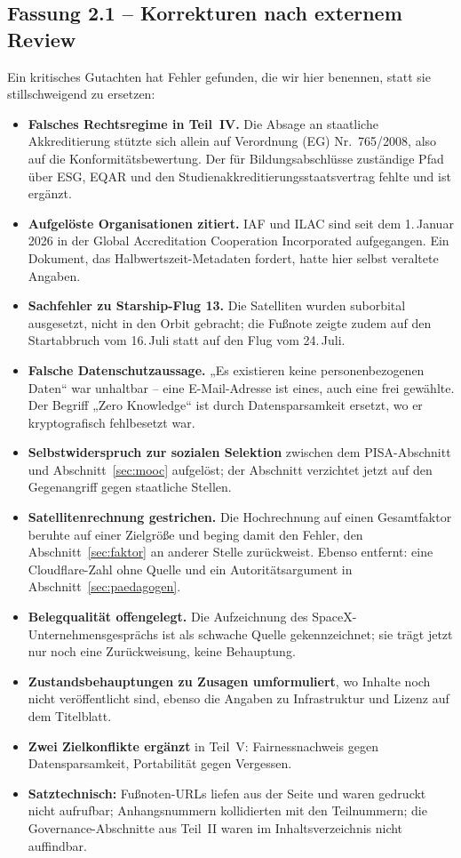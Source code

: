 \documentclass[11pt,a4paper]{article}
\begin{document}
\subsection{Fassung 2.1 -- Korrekturen nach externem Review}
Ein kritisches Gutachten hat Fehler gefunden, die wir hier benennen, statt sie stillschweigend zu ersetzen:
\begin{itemize}[label=--]
    \item \textbf{Falsches Rechtsregime in Teil~IV.} Die Absage an staatliche Akkreditierung stützte sich allein auf Verordnung (EG) Nr.~765/2008, also auf die Konformitätsbewertung. Der für Bildungsabschlüsse zuständige Pfad über ESG, EQAR und den Studienakkreditierungsstaatsvertrag fehlte und ist ergänzt.
    \item \textbf{Aufgelöste Organisationen zitiert.} IAF und ILAC sind seit dem 1.\,Januar 2026 in der Global Accreditation Cooperation Incorporated aufgegangen. Ein Dokument, das Halb\-werts\-zeit-Meta\-daten fordert, hatte hier selbst veraltete Angaben.
    \item \textbf{Sachfehler zu Starship-Flug 13.} Die Satelliten wurden suborbital ausgesetzt, nicht in den Orbit gebracht; die Fußnote zeigte zudem auf den Startabbruch vom 16.\,Juli statt auf den Flug vom 24.\,Juli.
    \item \textbf{Falsche Datenschutzaussage.} „Es existieren keine personenbezogenen Daten“ war unhaltbar -- eine E-Mail-Adresse ist eines, auch eine frei gewählte. Der Begriff „Zero Knowledge“ ist durch Datensparsamkeit ersetzt, wo er kryptografisch fehlbesetzt war.
    \item \textbf{Selbstwiderspruch zur sozialen Selektion} zwischen dem PISA-Abschnitt und Abschnitt~\ref{sec:mooc} aufgelöst; der Abschnitt verzichtet jetzt auf den Gegenangriff gegen staatliche Stellen.
    \item \textbf{Satellitenrechnung gestrichen.} Die Hochrechnung auf einen Gesamtfaktor beruhte auf einer Zielgröße und beging damit den Fehler, den Abschnitt~\ref{sec:faktor} an anderer Stelle zurückweist. Ebenso entfernt: eine Cloudflare-Zahl ohne Quelle und ein Autoritätsargument in Abschnitt~\ref{sec:paedagogen}.
    \item \textbf{Belegqualität offengelegt.} Die Aufzeichnung des SpaceX-Unternehmensgesprächs ist als schwache Quelle gekennzeichnet; sie trägt jetzt nur noch eine Zurückweisung, keine Behauptung.
    \item \textbf{Zustandsbehauptungen zu Zusagen umformuliert}, wo Inhalte noch nicht veröffentlicht sind, ebenso die Angaben zu Infrastruktur und Lizenz auf dem Titelblatt.
    \item \textbf{Zwei Zielkonflikte ergänzt} in Teil~V: Fairnessnachweis gegen Datensparsamkeit, Portabilität gegen Vergessen.
    \item \textbf{Satztechnisch:} Fußnoten-URLs liefen aus der Seite und waren gedruckt nicht aufrufbar; Anhangsnummern kollidierten mit den Teilnummern; die Governance-Abschnitte aus Teil~II waren im Inhaltsverzeichnis nicht auffindbar.
\end{itemize}
\end{document}
